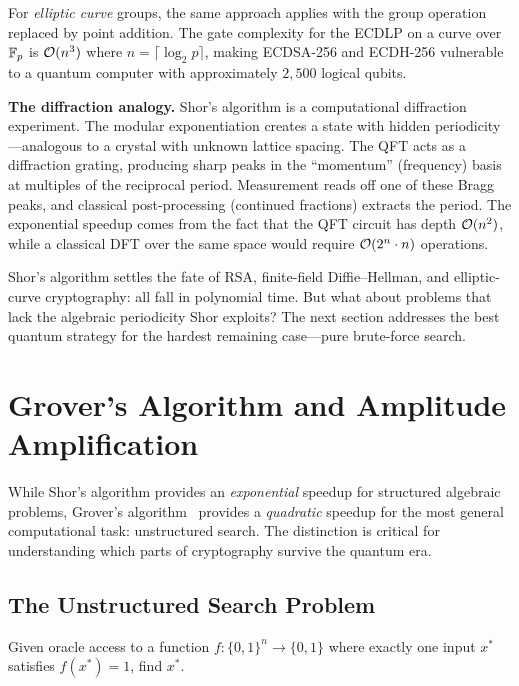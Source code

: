For \emph{elliptic curve} groups, the same approach applies with the group operation replaced by point addition.  The gate complexity for the ECDLP on a curve over $\mathbb{F}_p$ is $\mathcal{O}(n^3)$ where $n = \lceil\log_2 p\rceil$, making ECDSA-256 and ECDH-256 vulnerable to a quantum computer with approximately $2{,}500$ logical qubits.

\begin{svgraybox}
\textbf{The diffraction analogy.}
Shor's algorithm is a computational diffraction experiment.  The modular exponentiation creates a state with hidden periodicity---analogous to a crystal with unknown lattice spacing.  The QFT acts as a diffraction grating, producing sharp peaks in the ``momentum'' (frequency) basis at multiples of the reciprocal period.  Measurement reads off one of these Bragg peaks, and classical post-processing (continued fractions) extracts the period.  The exponential speedup comes from the fact that the QFT circuit has depth $\mathcal{O}(n^2)$, while a classical DFT over the same space would require $\mathcal{O}(2^n \cdot n)$ operations.
\end{svgraybox}

Shor's algorithm settles the fate of RSA, finite-field Diffie--Hellman, and elliptic-curve cryptography: all fall in polynomial time.  But what about problems that lack the algebraic periodicity Shor exploits?  The next section addresses the best quantum strategy for the hardest remaining case---pure brute-force search.


\section{Grover's Algorithm and Amplitude Amplification}
\label{sec:grover}

While Shor's algorithm provides an \emph{exponential} speedup for structured algebraic problems, Grover's algorithm~\cite{Grover1996} provides a \emph{quadratic} speedup for the most general computational task: unstructured search.  The distinction is critical for understanding which parts of cryptography survive the quantum era.

\subsection{The Unstructured Search Problem}
\label{subsec:search-problem}

\begin{definition}
\label{def:unstructured-search}
Given oracle access to a function $f\colon \{0,1\}^n \to \{0,1\}$ where exactly one input $x^*$ satisfies $f(x^*) = 1$, find $x^*$.
\end{definition}

